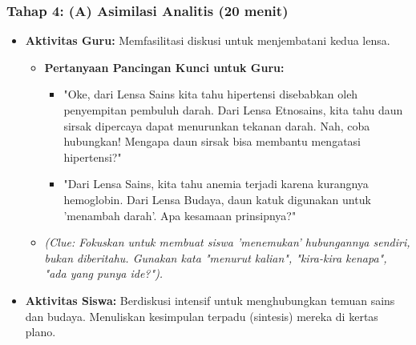 \documentclass[a4paper,12pt]{article}
\begin{document}
\subsubsection{Tahap 4: (A) Asimilasi Analitis (20 menit)}
\begin{itemize}
\item \textbf{Aktivitas Guru:} Memfasilitasi diskusi untuk menjembatani kedua lensa.
    \begin{itemize}
    \item \textbf{Pertanyaan Pancingan Kunci untuk Guru:}
        \begin{itemize}
        \item "Oke, dari Lensa Sains kita tahu hipertensi disebabkan oleh penyempitan pembuluh darah. Dari Lensa Etnosains, kita tahu daun sirsak dipercaya dapat menurunkan tekanan darah. Nah, coba hubungkan! Mengapa daun sirsak bisa membantu mengatasi hipertensi?"
        \item "Dari Lensa Sains, kita tahu anemia terjadi karena kurangnya hemoglobin. Dari Lensa Budaya, daun katuk digunakan untuk 'menambah darah'. Apa kesamaan prinsipnya?"
        \end{itemize}
    \item \textit{(Clue: Fokuskan untuk membuat siswa 'menemukan' hubungannya sendiri, bukan diberitahu. Gunakan kata "menurut kalian", "kira-kira kenapa", "ada yang punya ide?").}
    \end{itemize}
\item \textbf{Aktivitas Siswa:} Berdiskusi intensif untuk menghubungkan temuan sains dan budaya. Menuliskan kesimpulan terpadu (sintesis) mereka di kertas plano.
\end{itemize}
\end{document}
